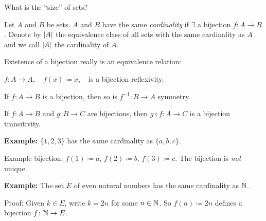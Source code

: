 \documentclass[10pt,aspectratio=169]{beamer}
\begin{document}
\begin{frame}
What is the ``size'' of sets?

\pause

\begin{definition}
Let $A$ and $B$ be sets.  $A$ and $B$ have the same
\emph{cardinality}
if $\exists$ a bijection $f \colon A \to B$.
\pause
Denote by $\left\lvert {A} \right\rvert$ the equivalence class of all sets with the same cardinality as
$A$ and we call $\left\lvert {A} \right\rvert$ the cardinality of $A$.
\end{definition}

\pause
Existence of a bijection really is an equivalence relation:

\pause
$f \colon A \to A$, ~ $f(x) \coloneqq x$, ~ is a bijection \wthus reflexivity.

\pause
If $f \colon A \to B$ is a bijection, then so is $f^{-1} \colon B \to A$ \wthus symmetry.

\pause
If $f \colon A \to B$ and $g \colon B \to C$ are bijections, then
$g \circ f \colon A \to C$ is a bijection
\wthus transitivity.

\medskip
\pause

\textbf{Example:}
$\{ 1,2,3 \}$ has the same cardinality as $\{ a,b,c \}$.

\pause
Example bijection: $f(1) \coloneqq a$, $f(2) \coloneqq b$, $f(3) \coloneqq c$.
\pause  The bijection is \emph{not} unique.

\medskip
\pause

\textbf{Example:}
The set $E$ of even natural numbers has the same cardinality as ${\mathbb{N}}$.

\pause
Proof:
Given $k \in E$, write $k=2n$ for some $n \in {\mathbb{N}}$.
\pause
So
$f(n) \coloneqq 2n$ defines a bijection $f \colon {\mathbb{N}} \to E$.

\end{frame}
\end{document}

